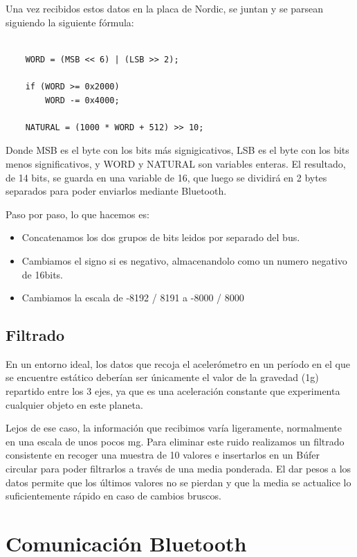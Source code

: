 Una vez recibidos estos datos en la placa de Nordic, se juntan y se parsean siguiendo la siguiente fórmula:

\begin{lstlisting}[frame=single]

	WORD = (MSB << 6) | (LSB >> 2);
	
	if (WORD >= 0x2000)
		WORD -= 0x4000;

	NATURAL = (1000 * WORD + 512) >> 10;

\end{lstlisting}

Donde MSB es el byte con los bits más signigicativos, LSB es el byte con los bits menos significativos, y WORD y NATURAL son variables enteras. El resultado, de 14 bits, se guarda en una variable de 16, que luego se dividirá en 2 bytes separados para poder enviarlos mediante Bluetooth.

Paso por paso, lo que hacemos es:

\begin{itemize}
	\item Concatenamos los dos grupos de bits leidos por separado del bus.
	\item Cambiamos el signo si es negativo, almacenandolo como un numero negativo de 16bits.
	\item Cambiamos la escala de -8192 / 8191 a -8000 / 8000
\end{itemize}

\subsection{Filtrado}
\label{makereference5.4.2}

En un entorno ideal, los datos que recoja el acelerómetro en un período en el que se encuentre estático deberían ser únicamente el valor de la gravedad (1g) repartido entre los 3 ejes, ya que es una aceleración constante que experimenta cualquier objeto en este planeta.

Lejos de ese caso, la información que recibimos varía ligeramente, normalmente en una escala de unos pocos mg. Para eliminar este ruido realizamos un filtrado consistente en recoger una muestra de 10 valores e insertarlos en un Búfer circular para poder filtrarlos a través de una media ponderada. El dar pesos a los datos permite que los últimos valores no se pierdan y que la media se actualice lo suficientemente rápido en caso de cambios bruscos.

\section{Comunicación Bluetooth}
\label{makereference5.2}


